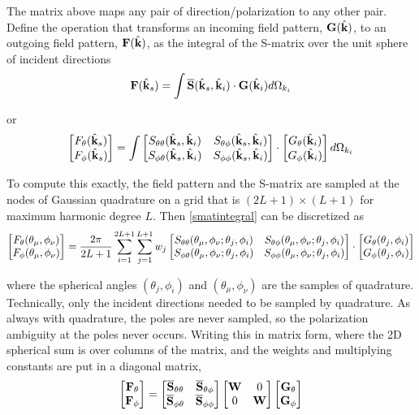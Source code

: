 The matrix above maps any pair of direction/polarization to any other pair.  Define the operation that transforms an incoming field pattern, $\mathbf{G}(\hat{\mathbf{k}})$, to an outgoing field pattern, $\mathbf{F}(\hat{\mathbf{k}})$, as the integral of the S-matrix over the unit sphere of incident directions 
\begin{equation}
\mathbf{F}(\hat{\mathbf{k}}_s) = \int \overline{\mathbf{S}}(\hat{\mathbf{k}}_s,\hat{\mathbf{k}}_i)\cdot \mathbf{G}(\hat{\mathbf{k}}_i) d\Omega_{k_i}
\end{equation}

or
\begin{equation}
\begin{bmatrix} F_{\theta}(\hat{\mathbf{k}}_s) \\ F_{\phi}(\hat{\mathbf{k}}_s) \end{bmatrix} = 
\int \begin{bmatrix} S_{\theta\theta}(\hat{\mathbf{k}}_s,\hat{\mathbf{k}}_i) & S_{\theta\phi}(\hat{\mathbf{k}}_s,\hat{\mathbf{k}}_i) \\ S_{\phi\theta}(\hat{\mathbf{k}}_s,\hat{\mathbf{k}}_i) & S_{\phi\phi}(\hat{\mathbf{k}}_s,\hat{\mathbf{k}}_i) \end{bmatrix}
\cdot \begin{bmatrix} G_{\theta}(\hat{\mathbf{k}}_i) \\ G_{\phi}(\hat{\mathbf{k}}_i) \end{bmatrix} d\Omega_{k_i} \label{smatintegral}
\end{equation}

To compute this exactly, the field pattern and the S-matrix are sampled at the nodes of Gaussian quadrature on a grid that is $(2L+1) \times (L+1)$ for maximum harmonic degree $L$. Then \eqref{smatintegral} can be discretized as
 \begin{equation}
\begin{bmatrix} F_{\theta}(\theta_{\mu},\phi_{\nu}) \\ F_{\phi}(\theta_{\mu},\phi_{\nu}) \end{bmatrix} = 
\dfrac{2\pi}{2L+1}  \sum_{i=1}^{2L+1} \sum_{j=1}^{L+1} w_j \begin{bmatrix} S_{\theta\theta}(\theta_{\mu},\phi_{\nu};\theta_j,\phi_i) & S_{\theta\phi}(\theta_{\mu},\phi_{\nu};\theta_j,\phi_i) \\ S_{\phi\theta}(\theta_{\mu},\phi_{\nu};\theta_j,\phi_i) & S_{\phi\phi}(\theta_{\mu},\phi_{\nu};\theta_j,\phi_i) \end{bmatrix} \cdot \begin{bmatrix} G_{\theta}(\theta_j,\phi_i) \\ G_{\phi}(\theta_j,\phi_i) \end{bmatrix} 
\end{equation}

\noindent where the spherical angles $(\theta_j,\phi_i)$ and $(\theta_{\mu},\phi_{\nu})$ are the samples of quadrature.  Technically, only the incident directions needed to be sampled by quadrature. As always with quadrature, the poles are never sampled, so the polarization ambiguity at the poles never occurs. Writing this in matrix form, where the 2D spherical sum is over columns of the matrix, and the weights and multiplying constants are put in a diagonal matrix,\begin{equation}
\begin{bmatrix} \mathbf{F}_{\theta} \\ \mathbf{F}_{\phi} \end{bmatrix} = 
\begin{bmatrix} \overline{\mathbf{S}}_{\theta\theta} & \overline{\mathbf{S}}_{\theta\phi} \\ \overline{\mathbf{S}}_{\phi\theta} & \overline{\mathbf{S}}_{\phi\phi} \end{bmatrix} \begin{bmatrix} \mathbf{W} & 0 \\ 0 & \mathbf{W} \end{bmatrix}\begin{bmatrix} \mathbf{G}_{\theta} \\ \mathbf{G}_{\phi} \end{bmatrix}  \label{FSWG}
\end{equation}

